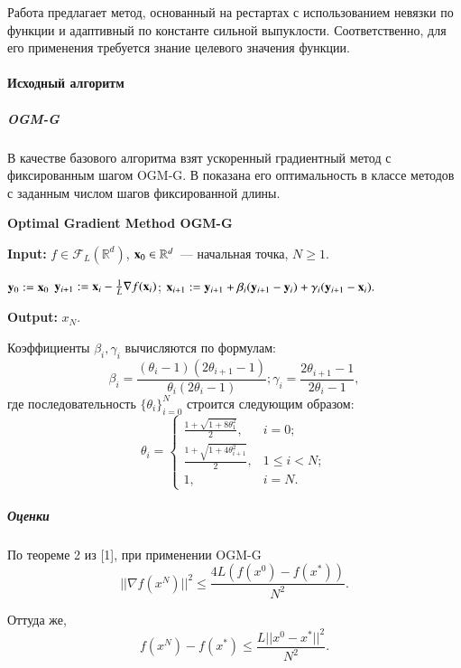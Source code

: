 \documentclass{crm-article}
\begin{document}
Работа \cite{barre2020taylor} предлагает метод, основанный на рестартах с использованием невязки по функции и адаптивный по константе сильной выпуклости. Соответственно, для его применения требуется знание целевого значения функции.

\paragraph{Исходный алгоритм}
\subparagraph{OGM-G}

В качестве базового алгоритма взят ускоренный градиентный метод с фиксированным шагом OGM-G. В \cite{kim2018fessler} показана его оптимальность в классе методов с заданным числом шагов фиксированной длины.

\begin{algorithm}
\caption{\bf{Optimal Gradient Method OGM-G}}
\label{OGM-G}
\hspace*{\algorithmicindent} \textbf{Input: }$f\in \mathcal{F}_L(\mathbb{R}^d)$, ${\bf x}_0\in\mathbb{R}^d$~--- начальная точка, $N\geq 1$.
\begin{algorithmic}[1]
\STATE ${\bf y}_0 := {\bf x}_0$
\STATE ${\bf y}_{i+1} := {\bf x}_i - \frac{1}{L}\nabla f({\bf x}_i)$;
\STATE ${\bf x}_{i+1} := {\bf y}_{i+1} + \beta_i({\bf y}_{i+1} - {\bf y}_i) + \gamma_i({\bf y}_{i+1} - {\bf x}_i).$
\ENDFOR
\end{algorithmic}
\hspace*{\algorithmicindent} \textbf{Output: } $x_N$.
\end{algorithm}

Коэффициенты $\beta_i, \gamma_i$ вычисляются по формулам:
$$\beta_i = \dfrac{(\theta_i-1)(2\theta_{i+1}-1)}{\theta_i(2\theta_i-1)}; \gamma_i = \dfrac{2\theta_{i+1}-1}{2\theta_i-1},$$
где последовательность $\{\theta_i\}_{i=0}^N$ строится следующим образом:
\[ \theta_i = \begin{cases}
\frac{1+\sqrt{1+8\theta_1^2}}{2}, & i=0;\\
\frac{1+\sqrt{1+4\theta_{i+1}^2}}{2}, & 1\leq i<N;\\
1, & i=N.
\end{cases} \]

\subparagraph{Оценки}

По теореме 2 из [1], при применении OGM-G
\begin{equation}
||\nabla f(x^N)||^2\leq \frac{4L(f(x^0)-f(x^*))}{N^2}.
\end{equation}

Оттуда же,
\begin{equation}
f(x^N)-f(x^*)\leq \frac{L||x^0-x^*||^2}{N^2}.
\end{equation}
\end{document}

